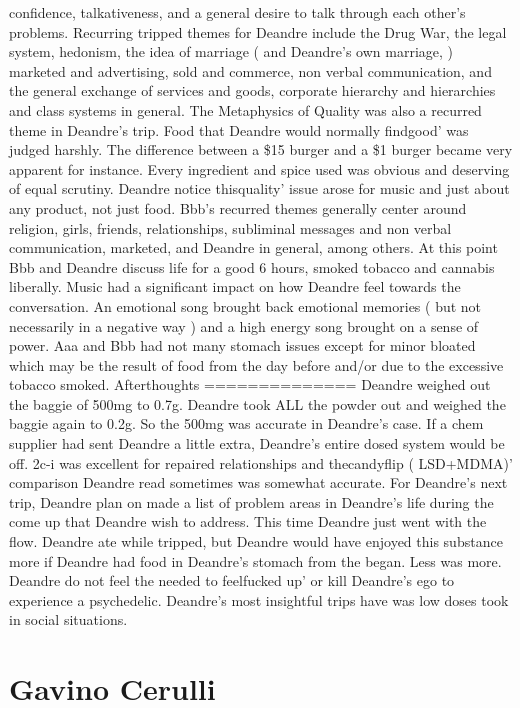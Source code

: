 \documentclass[12pt]{book}
\begin{document}
confidence, talkativeness, and a general desire to talk through each other's problems. Recurring tripped themes for Deandre include the Drug War, the legal system, hedonism, the idea of marriage ( and Deandre's own marriage, ) marketed and advertising, sold and commerce, non verbal communication, and the general exchange of services and goods, corporate hierarchy and hierarchies and class systems in general. The Metaphysics of Quality was also a recurred theme in Deandre's trip. Food that Deandre would normally findgood' was judged harshly. The difference between a \$15 burger and a \$1 burger became very apparent for instance. Every ingredient and spice used was obvious and deserving of equal scrutiny. Deandre notice thisquality' issue arose for music and just about any product, not just food. Bbb's recurred themes generally center around religion, girls, friends, relationships, subliminal messages and non verbal communication, marketed, and Deandre in general, among others. At this point Bbb and Deandre discuss life for a good 6 hours, smoked tobacco and cannabis liberally. Music had a significant impact on how Deandre feel towards the conversation. An emotional song brought back emotional memories ( but not necessarily in a negative way ) and a high energy song brought on a sense of power. Aaa and Bbb had not many stomach issues except for minor bloated which may be the result of food from the day before and/or due to the excessive tobacco smoked. Afterthoughts ============== Deandre weighed out the baggie of 500mg to 0.7g. Deandre took ALL the powder out and weighed the baggie again to 0.2g. So the 500mg was accurate in Deandre's case. If a chem supplier had sent Deandre a little extra, Deandre's entire dosed system would be off. 2c-i was excellent for repaired relationships and thecandyflip ( LSD+MDMA)' comparison Deandre read sometimes was somewhat accurate. For Deandre's next trip, Deandre plan on made a list of problem areas in Deandre's life during the come up that Deandre wish to address. This time Deandre just went with the flow. Deandre ate while tripped, but Deandre would have enjoyed this substance more if Deandre had food in Deandre's stomach from the began. Less was more. Deandre do not feel the needed to feelfucked up' or kill Deandre's ego to experience a psychedelic. Deandre's most insightful trips have was low doses took in social situations.



\chapter{Gavino Cerulli}
\end{document}
